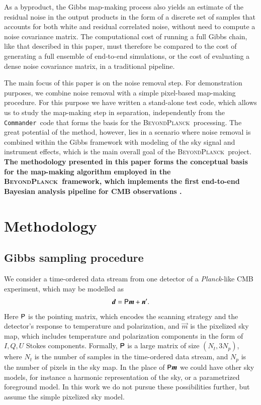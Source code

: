 \documentclass[twocolumn]{aa}
\newcommand{\ve}[1]{{\vec #1}}
\newcommand{\ma}[1]{\tens{#1}}
\newcommand{\BP}{\textsc{BeyondPlanck}}
\def\Planck{\textit{Planck}}
\def\commander{\texttt{Commander}}
\begin{document}
As a byproduct, the Gibbs map-making process also yields an estimate
of the residual noise in the output products in the form of a discrete
set of samples that accounts for both white and residual correlated
noise, without need to compute a noise covariance matrix. The
computational cost of running a full Gibbs chain, like that described
in this paper, must therefore be compared to the cost of generating a
full ensemble of end-to-end simulations, or the cost of evaluating a
dense noise covariance matrix, in a traditional pipeline.

The main focus of this paper is on the noise removal step.  For
demonstration purposes, we combine noise removal with a simple
pixel-based map-making procedure.  For this purpose we have written a
stand-alone test code, which allows us to study the map-making step in
separation, independently from the \commander\ code
{\bf \citep{eriksen2008,bp03}} that forms the basis for the \BP\ processing.  
The great potential of the method, however, lies in a
scenario where noise removal is combined within the Gibbs framework
with modeling of the sky signal and instrument effects, which is the
main overall goal of the \BP\ project.
{\bf The methodology presented in this paper forms the conceptual basis
  for the map-making algorithm employed in the \BP\ framework, which
  implements the first end-to-end Bayesian analysis pipeline for CMB
  observations \citep{bp01,bp03}.  }

\section{Methodology}
\label{sec:method}

\subsection{Gibbs sampling procedure}

We consider a time-ordered data stream from one detector
of a \Planck-like CMB experiment, which may be modelled as
%
\begin{equation}
  \ve{d} = \ma{P}\ve{m}  +\ve{n'}.
\end{equation}
%
Here $\ma{P}$ is the pointing matrix, which encodes the scanning
strategy and the detector's response to temperature and polarization,
and $\ve{m}$ is the pixelized sky map, which includes temperature and
polarization components in the form of $I,Q,U$ Stokes components.
Formally, $\ma P$ is a large matrix of size $(N_t,3N_p)$, where $N_t$
is the number of samples in the time-ordered data stream, and $N_p$ is
the number of pixels in the sky map.  In the place of $\ma{P}\ve{m}$
we could have other sky models, for instance a harmonic representation
of the sky, or a parametrized foreground model.  In this work we do
not pursue these possibilities further, but assume the simple
pixelized sky model.
\end{document}
